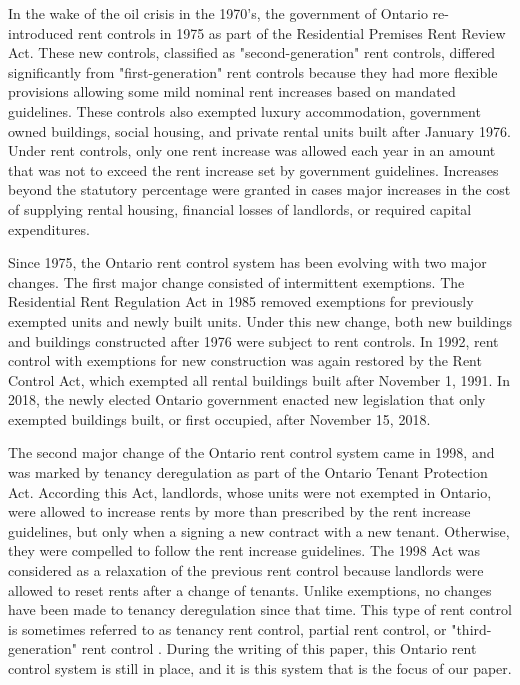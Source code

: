 \documentclass[parskip=full]{article}
\begin{document}
In the wake of the oil crisis in the 1970's, the government of Ontario re-introduced rent controls in 1975 as part of the Residential Premises Rent Review Act. These new controls, classified as "second-generation" rent controls, differed significantly from "first-generation" rent controls because they had more flexible provisions allowing some mild nominal rent increases based on mandated guidelines. These controls also exempted luxury accommodation, government owned buildings, social housing, and private rental units built after January 1976. Under rent controls, only one rent increase was allowed each year in an amount that was not to exceed the rent increase set by government guidelines. Increases beyond the statutory percentage were granted in cases major increases in the cost of supplying rental housing, financial losses of landlords, or required capital expenditures. 

Since 1975, the Ontario rent control system has been evolving with two major changes. The first major change consisted of intermittent exemptions. The Residential Rent Regulation Act in 1985 removed exemptions for previously exempted units and newly built units. Under this new change, both new buildings and buildings constructed after 1976 were subject to rent controls. In 1992, rent control with exemptions for new construction was again restored by the Rent Control Act, which exempted all rental buildings built after November 1, 1991. In 2018, the newly elected Ontario government enacted new legislation that only exempted buildings built, or first occupied, after November 15, 2018.

The second major change of the Ontario rent control system came in 1998, and was marked by tenancy deregulation as part of the Ontario Tenant Protection Act. According this Act, landlords, whose units were not exempted in Ontario, were allowed to increase rents by more than prescribed by the rent increase guidelines, but only when a signing a new contract with a new tenant. Otherwise, they were compelled to follow the rent increase guidelines. The 1998 Act was considered as a relaxation of the previous rent control because landlords were allowed to reset rents after a change of tenants. Unlike exemptions, no changes have been made to tenancy deregulation since that time. This type of rent control is sometimes referred to as tenancy rent control, partial rent control, or "third-generation" rent control \citep{arnott-2003}. During the writing of this paper, this Ontario rent control system is still in place, and it is this system that is the focus of our paper. 
\end{document}
